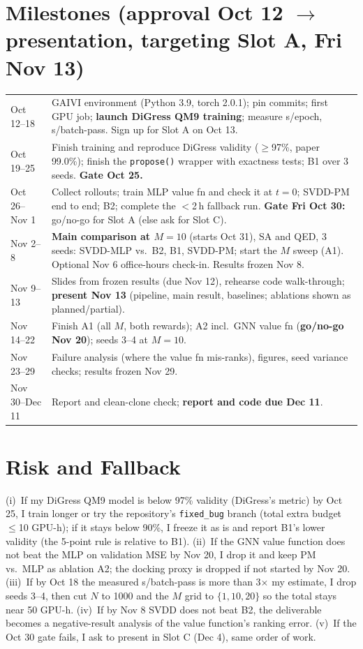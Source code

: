 \documentclass[10pt]{article}
\begin{document}
\normalsize\section{Milestones (approval Oct 12 $\to$ presentation, targeting Slot A, Fri Nov 13)}
\begin{tabular}{@{}p{1.15in}p{5.7in}@{}}
Oct 12--18 & GAIVI environment (Python 3.9, torch 2.0.1); pin commits; first GPU job; \textbf{launch DiGress QM9 training}; measure s/epoch, s/batch-pass. Sign up for Slot A on Oct 13.\\
Oct 19--25 & Finish training and reproduce DiGress validity ($\ge$97\%, paper 99.0\%); finish the \texttt{propose()} wrapper with exactness tests; B1 over 3 seeds. \textbf{Gate Oct 25.}\\
Oct 26--Nov 1 & Collect rollouts; train MLP value fn and check it at $t{=}0$; SVDD-PM end to end; B2; complete the $<$2\,h fallback run. \textbf{Gate Fri Oct 30:} go/no-go for Slot A (else ask for Slot C).\\
Nov 2--8 & \textbf{Main comparison at $M{=}10$} (starts Oct 31), SA and QED, 3 seeds: SVDD-MLP vs.\ B2, B1, SVDD-PM; start the $M$ sweep (A1). Optional Nov 6 office-hours check-in. Results frozen Nov 8.\\
Nov 9--13 & Slides from frozen results (due Nov 12), rehearse code walk-through; \textbf{present Nov 13} (pipeline, main result, baselines; ablations shown as planned/partial).\\
Nov 14--22 & Finish A1 (all $M$, both rewards); A2 incl.\ GNN value fn (\textbf{go/no-go Nov 20}); seeds 3--4 at $M{=}10$.\\
Nov 23--29 & Failure analysis (where the value fn mis-ranks), figures, seed variance checks; results frozen Nov 29.\\
Nov 30--Dec 11 & Report and clean-clone check; \textbf{report and code due Dec 11}.\\
\end{tabular}

\section{Risk and Fallback}\small
(i)~If my DiGress QM9 model is below 97\% validity (DiGress's metric) by Oct 25, I train longer or try the repository's \texttt{fixed\_bug} branch (total extra budget $\le$10 GPU-h); if it stays below 90\%, I freeze it as is and report B1's lower validity (the 5-point rule is relative to B1). (ii)~If the GNN value function does not beat the MLP on validation MSE by Nov 20, I drop it and keep PM vs.\ MLP as ablation A2; the docking proxy is dropped if not started by Nov 20. (iii)~If by Oct 18 the measured s/batch-pass is more than 3$\times$ my estimate, I drop seeds 3--4, then cut $N$ to 1000 and the $M$ grid to $\{1,10,20\}$ so the total stays near 50 GPU-h. (iv)~If by Nov 8 SVDD does not beat B2, the deliverable becomes a negative-result analysis of the value function's ranking error. (v)~If the Oct 30 gate fails, I ask to present in Slot C (Dec 4), same order of work.
\end{document}
